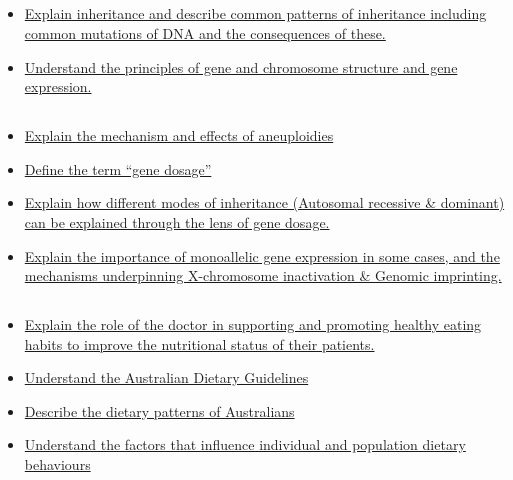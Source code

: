 \documentclass[10pt, a4paper]{article}
\begin{document}
\subsection{} \begin{itemize} \item \href{https://www.notion.so/3fce9bbb97fe4d1eadaabf277da82a16}{Explain inheritance and describe common patterns of inheritance including common mutations of DNA and the consequences of these.} \item \href{https://www.notion.so/c08c0f9b397b446e859b4c16c43d8ebf}{Understand the principles of gene and chromosome structure and gene expression.} \end{itemize}
\subsection{} \begin{itemize} \item \href{https://www.notion.so/368af7e928214a478e50e03d8b9aa5ba}{Explain the mechanism and effects of aneuploidies} \item \href{https://www.notion.so/3a838d4683164397a42529e0dbb628ab}{Define the term “gene dosage”} \item \href{https://www.notion.so/f324a315650e4efb8d5dcd147f59c4e3}{Explain how different modes of inheritance (Autosomal recessive \& dominant) can be explained through the lens of gene dosage.} \item \href{https://www.notion.so/2860c3d39dfa4198a6e90b8550a2eb98}{Explain the importance of monoallelic gene expression in some cases, and the mechanisms underpinning X-chromosome inactivation \& Genomic imprinting. } \end{itemize}
\subsection{} \begin{itemize} \item \href{https://www.notion.so/5c841682592643f0a023819dc3c0ade3}{Explain the role of the doctor in supporting and promoting healthy eating habits to improve the nutritional status of their patients.} \item \href{https://www.notion.so/e262bae670d346a5a770b5842bf92928}{Understand the Australian Dietary Guidelines} \item \href{https://www.notion.so/a9eba380011c4742b8044c0ec9fc8882}{Describe the dietary patterns of Australians} \item \href{https://www.notion.so/2345f8f6485347d88362a87b12ed3f4a}{Understand the factors that influence individual and population dietary behaviours} \end{itemize}
\end{document}
